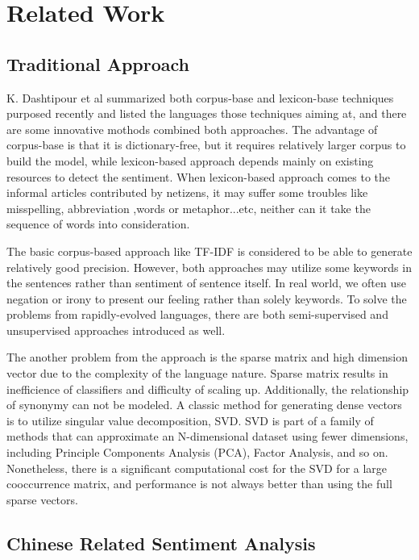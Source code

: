 \chapter{Related Work}


\section{Traditional Approach}

K. Dashtipour et al \cite{Dashtipour2016} summarized both corpus-base and lexicon-base techniques purposed recently and listed the languages those techniques aiming at, and there are some innovative mothods combined both approaches. 
The advantage of corpus-base is that it is dictionary-free, but it requires relatively larger corpus to build the model, while lexicon-based approach depends mainly on existing resources to detect the sentiment.
When lexicon-based approach comes to the informal articles contributed by netizens, it may suffer some troubles like misspelling, abbreviation ,words or metaphor...etc, neither can it take the sequence of words into consideration.   

The basic corpus-based approach like TF-IDF is considered to be able to generate relatively good precision.
However, both approaches may utilize some keywords in the sentences rather than sentiment of sentence itself. In real world, we often use negation or irony to present our feeling rather than solely keywords.
To solve the problems from rapidly-evolved languages, there are both semi-supervised and unsupervised approaches introduced as well. 

The another problem from the approach is the sparse matrix and high dimension vector due to the complexity of the language nature. 
Sparse matrix results in inefficience of classifiers and difficulty of scaling up. Additionally, the relationship of synonymy can not be modeled.
A classic method for generating dense vectors is to utilize singular value decomposition, SVD.
SVD is part of a family of methods that can approximate an N-dimensional dataset using fewer dimensions, including Principle Components Analysis (PCA), Factor Analysis, and so on.
Nonetheless, there is a significant computational cost for the SVD for a large cooccurrence matrix, and performance is not always better than using the full sparse vectors.

\section{Chinese Related Sentiment Analysis}

